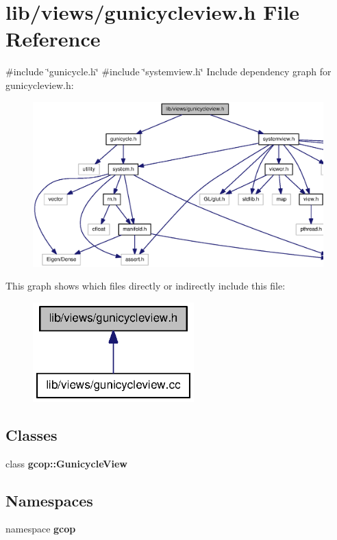 \section{lib/views/gunicycleview.h \-File \-Reference}
\label{gunicycleview_8h}
{\ttfamily \#include \char`\"{}gunicycle.\-h\char`\"{}}\*
{\ttfamily \#include \char`\"{}systemview.\-h\char`\"{}}\*
\-Include dependency graph for gunicycleview.\-h\-:\nopagebreak
\begin{figure}[H]
\begin{center}
\leavevmode
\includegraphics[width=350pt]{gunicycleview_8h__incl}
\end{center}
\end{figure}
\-This graph shows which files directly or indirectly include this file\-:\nopagebreak
\begin{figure}[H]
\begin{center}
\leavevmode
\includegraphics[width=176pt]{gunicycleview_8h__dep__incl}
\end{center}
\end{figure}
\subsection*{\-Classes}
\begin{DoxyCompactItemize}
\item 
class {\bf gcop\-::\-Gunicycle\-View}
\end{DoxyCompactItemize}
\subsection*{\-Namespaces}
\begin{DoxyCompactItemize}
\item 
namespace {\bf gcop}
\end{DoxyCompactItemize}
